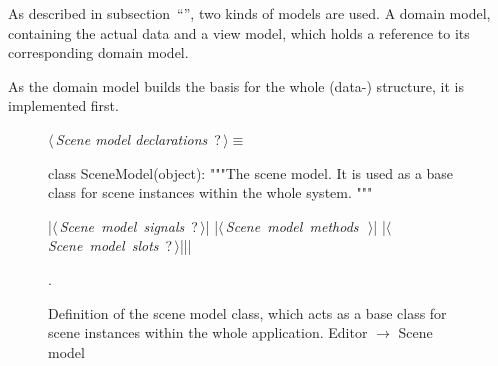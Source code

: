 \documentclass[%
    a4paper,    %
    justified,  %
    nobib,      %
    openany     %
]{tufte-book}
\begin{document}

As described in subsection~\enquote{},
two kinds of models are used. A domain model, containing the actual data and a
view model, which holds a reference to its corresponding domain model.

%

As the domain model builds the basis for the whole (data-) structure, it is
implemented first.

\begin{figure}
\begin{flushleft} \small
\begin{minipage}{\linewidth}\label{scrap21}\raggedright\small
{} $\langle\,${\itshape Scene model declarations}\nobreak\ {\footnotesize {?}}$\,\rangle\equiv$
\vspace{-1ex}
\begin{pythoncode}
class SceneModel(object):
    """The scene model.
    It is used as a base class for scene instances within the
    whole system.
    """

    |\hbox{$\langle\,${\itshape Scene model signals}\nobreak\ {\footnotesize ?}$\,\rangle$}|
    |\hbox{$\langle\,${\itshape Scene model methods}\nobreak\ {\footnotesize {}}$\,\rangle$}|
    |\hbox{$\langle\,${\itshape Scene model slots}\nobreak\ {\footnotesize ?}$\,\rangle$}||\NWsep|
\end{pythoncode}
\vspace{1.5ex}
\footnotesize
\begin{list}{}{\setlength{\itemsep}{-\parsep}\setlength{\itemindent}{-\leftmargin}}
\item {\NWtxtMacroNoRef}.

\item{}
\end{list}
\end{minipage}\vspace{4ex}
\end{flushleft}
\caption{Definition of the scene model class, which acts as a base class for
scene instances within the whole application.
  \newline{}\newline{}Editor $\rightarrow$ Scene model}
\label{editor:lst:scene-model}
\end{figure}
\end{document}
